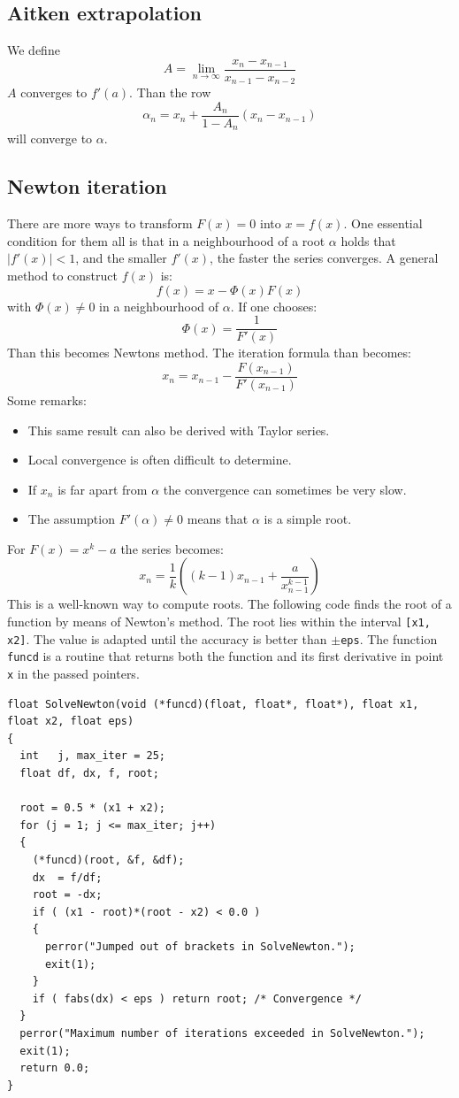 \documentclass[twoside]{report}
\begin{document}
\subsection{Aitken extrapolation}
We define
\[
A=\lim_{n\rightarrow\infty}\frac{x_n-x_{n-1}}{x_{n-1}-x_{n-2}}
\]
$A$ converges to $f'(a)$. Than the row
\[
\alpha_n=x_n+\frac{A_n}{1-A_n}(x_n-x_{n-1})
\]
will converge to $\alpha$.

\subsection{Newton iteration}
There are more ways to transform $F(x)=0$ into $x=f(x)$. One essential
condition for them all is that in a neighbourhood of a root $\alpha$ holds
that $|f'(x)|<1$, and the smaller $f'(x)$, the faster the series converges.
A general method to construct $f(x)$ is:
\[
f(x)=x-\Phi(x)F(x)
\]
with $\Phi(x)\neq0$ in a neighbourhood of $\alpha$. If one chooses:
\[
\Phi(x)=\frac{1}{F'(x)}
\]
Than this becomes Newtons method. The iteration formula than becomes:
\[
x_n=x_{n-1}-\frac{F(x_{n-1})}{F'(x_{n-1})}
\]
Some remarks:
\begin{itemize}
\item This same result can also be derived with Taylor series.
\item Local convergence is often difficult to determine.
\item If $x_n$ is far apart from $\alpha$ the convergence can sometimes be very slow.
\item The assumption $F'(\alpha)\neq0$ means that $\alpha$ is a simple root.
\end{itemize}
For $F(x)=x^k-a$ the series becomes:
\[
x_n=\frac{1}{k}\left((k-1)x_{n-1}+\frac{a}{x_{n-1}^{k-1}}\right)
\]
This is a well-known way to compute roots.
\npar
The following code finds the root of a function by means of Newton's method. The
root lies within the interval {\tt [x1, x2]}. The value is adapted until the
accuracy is better than {\tt$\pm$eps}. The function {\tt funcd} is a routine
that returns both the function and its first derivative in point {\tt x} in the
passed pointers.
\begin{verbatim}
float SolveNewton(void (*funcd)(float, float*, float*), float x1, float x2, float eps)
{
  int   j, max_iter = 25;
  float df, dx, f, root;

  root = 0.5 * (x1 + x2);
  for (j = 1; j <= max_iter; j++)
  {
    (*funcd)(root, &f, &df);
    dx  = f/df;
    root = -dx;
    if ( (x1 - root)*(root - x2) < 0.0 )
    {
      perror("Jumped out of brackets in SolveNewton.");
      exit(1);
    }
    if ( fabs(dx) < eps ) return root; /* Convergence */
  }
  perror("Maximum number of iterations exceeded in SolveNewton.");
  exit(1);
  return 0.0;
}
\end{verbatim}
\end{document}
